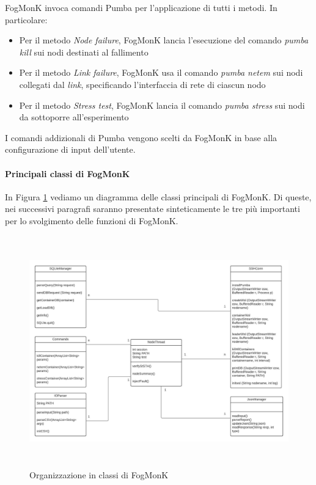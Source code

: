         FogMonK invoca comandi Pumba per l'applicazione di tutti i metodi. In particolare:
        \begin{itemize}
            \item Per il metodo \textit{Node failure}, FogMonK lancia l'esecuzione del comando \textit{pumba kill} sui nodi destinati al fallimento
            \item Per il metodo \textit{Link failure}, FogMonK usa il comando \textit{pumba netem} sui nodi collegati dal \textit{link}, specificando l'interfaccia di rete di ciascun nodo
            \item Per il metodo \textit{Stress test}, FogMonK lancia il comando \textit{pumba stress} sui nodi da sottoporre all'esperimento
        \end{itemize}
        I comandi addizionali di Pumba vengono scelti da FogMonK in base alla configurazione di input dell'utente.
        
        \paragraph{Principali classi di FogMonK}
        In Figura \ref{fig:classes} vediamo un diagramma delle classi principali di FogMonK. Di queste, nei successivi paragrafi saranno presentate sinteticamente le tre più importanti per lo svolgimento delle funzioni di FogMonK.
                
        \begin{figure}[H]
            \begin{center}
                \includegraphics[width=13cm, height=10cm]{images/diag.classi.tesi.jpeg}
                \caption {Organizzazione in classi di FogMonK}
                \label{fig:classes}
            \end{center}
        \end{figure}
        
